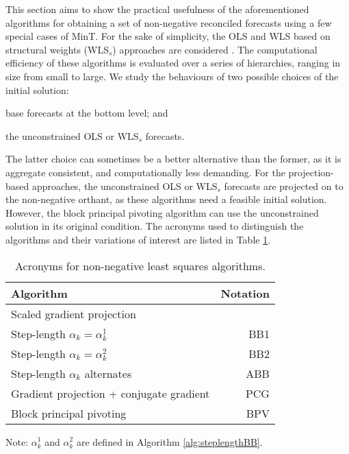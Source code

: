 \documentclass[11pt]{article}
\newcommand{\0}{\phantom{0}}
\begin{document}
This section aims to show the practical usefulness of the aforementioned algorithms for obtaining a set of non-negative reconciled forecasts using a few special cases of MinT. For the sake of simplicity, the OLS and WLS based on structural weights (WLS$_{s}$) approaches are considered \citep{Wick2018}. The computational efficiency of these algorithms is evaluated over a series of hierarchies, ranging in size from small to large. We study the behaviours of two possible choices of the initial solution: \begin{inparaenum}[(i)] \item base forecasts at the bottom level; and \item the unconstrained OLS or WLS$_{s}$ forecasts. \end{inparaenum} The latter choice can sometimes be a better alternative than the former, as it is aggregate consistent, and computationally less demanding. For the projection-based approaches, the unconstrained OLS or WLS$_{s}$ forecasts are projected on to the non-negative orthant, as these algorithms need a feasible initial solution. However, the block principal pivoting algorithm can use the unconstrained solution in its original condition. The acronyms used to distinguish the algorithms and their variations of interest are listed in Table \ref{tbl:acronn}. 

\begin{table}[ht]
	\centering
	
	\caption{Acronyms for non-negative least squares algorithms.}
	\label{tbl:acronn}
	\begin{threeparttable}
		\begin{tabular}{lr}
			\toprule
			Algorithm & Notation \\
			\midrule
			Scaled gradient projection & \\
			\hspace{0.5cm} Step-length $\alpha_{k} = \alpha_{k}^{1}$ & BB1 \\[0.1cm]
			\hspace{0.5cm} Step-length $\alpha_{k} = \alpha_{k}^{2}$ & BB2 \\[0.1cm]
			\hspace{0.5cm} Step-length $\alpha_{k}$ alternates & ABB\\[0.1cm]
			Gradient projection + conjugate gradient & PCG \\[0.1cm]
			Block principal pivoting & BPV \\
			\bottomrule
		\end{tabular}
		\begin{tablenotes}
			\item [] Note: $\alpha_{k}^{1}$ and $\alpha_{k}^{2}$ are defined in Algorithm \ref{alg:steplengthBB}.
		\end{tablenotes}
	\end{threeparttable}
\end{table}
\end{document}
